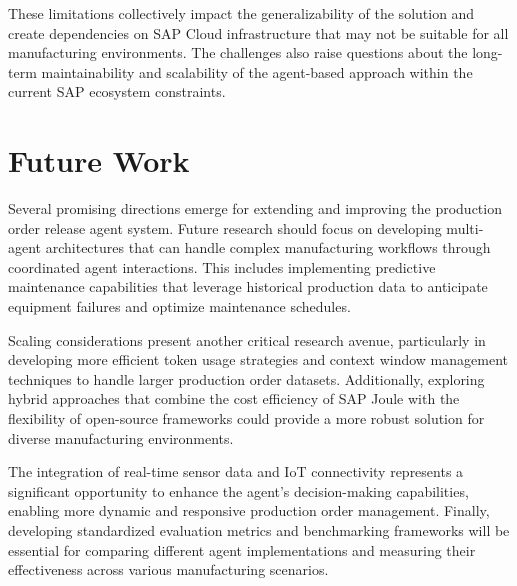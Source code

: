 These limitations collectively impact the generalizability of the solution and create dependencies on SAP Cloud infrastructure that may not be suitable for all manufacturing environments. The challenges also raise questions about the long-term maintainability and scalability of the agent-based approach within the current SAP ecosystem constraints.

\section{Future Work}

Several promising directions emerge for extending and improving the production order release agent system. Future research should focus on developing multi-agent architectures that can handle complex manufacturing workflows through coordinated agent interactions. This includes implementing predictive maintenance capabilities that leverage historical production data to anticipate equipment failures and optimize maintenance schedules.

Scaling considerations present another critical research avenue, particularly in developing more efficient token usage strategies and context window management techniques to handle larger production order datasets. Additionally, exploring hybrid approaches that combine the cost efficiency of SAP Joule with the flexibility of open-source frameworks could provide a more robust solution for diverse manufacturing environments.

The integration of real-time sensor data and IoT connectivity represents a significant opportunity to enhance the agent's decision-making capabilities, enabling more dynamic and responsive production order management. Finally, developing standardized evaluation metrics and benchmarking frameworks will be essential for comparing different agent implementations and measuring their effectiveness across various manufacturing scenarios.
